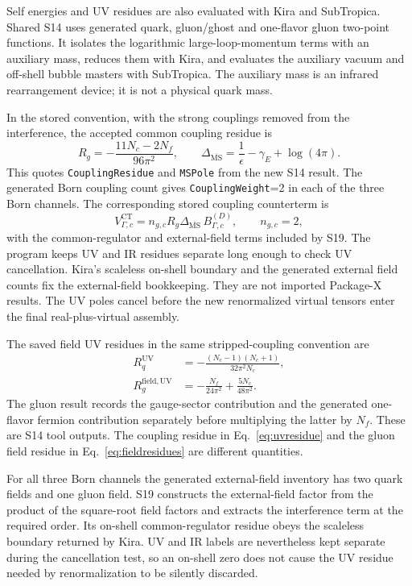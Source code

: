 \documentclass[11pt,a4paper]{article}
\newcommand{\eps}{\epsilon}
\newcommand{\MSbar}{\overline{\mathrm{MS}}}
\newcommand{\ct}{\mathrm{CT}}
\begin{document}
Self energies and UV residues are also evaluated with Kira and SubTropica.
Shared S14 uses generated quark, gluon/ghost and one-flavor gluon
two-point functions. It isolates the logarithmic large-loop-momentum
terms with an auxiliary mass, reduces them with Kira, and evaluates the
auxiliary vacuum and off-shell bubble masters with SubTropica.
The auxiliary mass is an infrared rearrangement device; it is not a
physical quark mass.

In the stored convention, with the strong couplings removed from the
interference, the accepted common coupling residue is
\begin{equation}
 R_g=-\frac{11N_c-2N_f}{96\pi^2},\qquad
 \Delta_{\MSbar}=\frac1\eps-\gamma_E+\log(4\pi).
 \label{eq:uvresidue}
\end{equation}
This quotes \texttt{CouplingResidue} and \texttt{MSPole} from the new S14
result. The generated Born coupling count gives
\texttt{CouplingWeight}=2 in each of the three Born channels.
The corresponding stored coupling counterterm is
\begin{equation}
 V^{\ct}_{\Gamma,c}
 =n_{g,c}R_g\Delta_{\MSbar}\,B_{\Gamma,c}^{(D)},
 \qquad n_{g,c}=2,
\end{equation}
with the common-regulator and external-field terms included by S19.
The program keeps UV and IR residues separate long enough to check UV
cancellation. Kira's scaleless on-shell boundary and the generated external
field counts fix the external-field bookkeeping. They are not imported
Package-X results. The UV poles cancel before the new renormalized virtual
tensors enter the final real-plus-virtual assembly.

The saved field UV residues in the same stripped-coupling convention are
\begin{align}
 R_q^{\mathrm{UV}}&=-\frac{(N_c-1)(N_c+1)}{32\pi^2N_c},\\
 R_g^{\mathrm{field,UV}}&=-\frac{N_f}{24\pi^2}
                         +\frac{5N_c}{48\pi^2}.
 \label{eq:fieldresidues}
\end{align}
The gluon result records the gauge-sector contribution and the generated
one-flavor fermion contribution separately before multiplying the latter
by $N_f$. These are S14 tool outputs. The coupling residue in
Eq.~\eqref{eq:uvresidue} and the gluon field residue in
Eq.~\eqref{eq:fieldresidues} are different quantities.

For all three Born channels the generated external-field inventory has
two quark fields and one gluon field. S19 constructs the external-field
factor from the product of the square-root field factors and extracts
the interference term at the required order. Its on-shell common-regulator
residue obeys the scaleless boundary returned by Kira. UV and IR
labels are nevertheless kept separate during the cancellation test, so
an on-shell zero does not cause the UV residue needed by renormalization
to be silently discarded.
\end{document}
